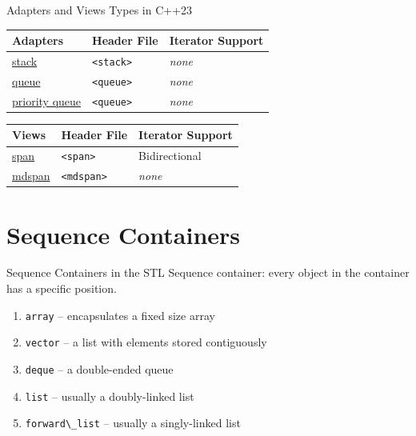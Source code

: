 \documentclass[14pt,aspectratio=1610]{beamer}
\begin{document}
\begin{frame}{Adapters and Views Types in C++23}
  \renewcommand{\arraystretch}{1.1}
  \newlength{\colAWidth}
  \settowidth{\colAWidth}{priority queue}
  \begin{tabular}{p{\colAWidth} l l}
    \toprule
      \textbf{Adapters} & \textbf{Header File} & \textbf{Iterator Support}\\
    \midrule
      \href{https://en.cppreference.com/w/cpp/container/stack}{stack}
        & \lstinline{<stack>} & \textit{none}\\
      \href{https://en.cppreference.com/w/cpp/container/queue}{queue}
        & \lstinline{<queue>} & \textit{none}\\
      \href{https://en.cppreference.com/w/cpp/container/priority_queue}{priority queue}
        & \lstinline{<queue>} & \textit{none}\\
    \bottomrule
  \end{tabular}


  \begin{tabular}{p{\colAWidth} l l}
    \toprule
      \textbf{Views} & \textbf{Header File} & \textbf{Iterator Support}\\
    \midrule
        \href{https://en.cppreference.com/w/cpp/container/span}{span}
        & \lstinline{<span>} & Bidirectional\\
        \href{https://en.cppreference.com/w/cpp/container/mdspan.html}{mdspan}
        & \lstinline{<mdspan>} & \textit{none}\\
    \bottomrule
  \end{tabular}
  
\end{frame}


\section{Sequence Containers}

\begin{frame}{Sequence Containers in the STL}
Sequence container: every object in the container has a specific position.

\begin{enumerate}
\item
  \lstinline{array} -- encapsulates a fixed size array
\item
  \lstinline{vector} -- a list with elements stored contiguously
\item
  \lstinline{deque} -- a double-ended queue
\item
  \lstinline{list} --  usually a doubly-linked list
  \item
  \lstinline{forward\_list} --  usually a singly-linked list
\end{enumerate}
\end{frame}
\end{document}
